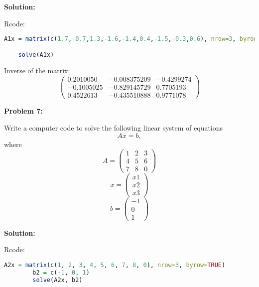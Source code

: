 \documentclass[12pt]{article}
\newenvironment{problem}[1]{
    \textbf{Problem #1:}
}{
    \rmfamily \vspace{1em}
}
\newenvironment{solution}{
    \textbf{Solution:}
    
}{
    
    \vspace{2em}
}
\begin{document}
\begin{solution}
    Rcode:
    \begin{lstlisting}[language=R]
    A1x = matrix(c(1.7,-0.7,1.3,-1.6,-1.4,0.4,-1.5,-0.3,0.6), nrow=3, byrow=TRUE)

    solve(A1x)
    \end{lstlisting}
    Inverse of the matrix:
    \[
    \begin{pmatrix}
        0.2010050 & -0.008375209 & -0.4299274 \\
        -0.1005025 & -0.829145729 & 0.7705193 \\
        0.4522613 & -0.435510888 & 0.9771078
    \end{pmatrix}
    \]
\end{solution}

\begin{problem}{7}
    Write a computer code to solve the following linear system of equations
    \[
        Ax = b,
    \]
    where
    \[
        A = \begin{pmatrix}
            1 & 2 & 3 \\
            4 & 5 & 6 \\
            7 & 8 & 0
        \end{pmatrix}
    \]
    \[
        x = \begin{pmatrix}
            x1 \\
            x2 \\
            x3
        \end{pmatrix}
    \]
    \[
        b = \begin{pmatrix}
            -1 \\
            0 \\
            1
        \end{pmatrix}
    \]
\end{problem}

\begin{solution}
    Rcode:
    \begin{lstlisting}[language=R]
        A2x = matrix(c(1, 2, 3, 4, 5, 6, 7, 8, 0), nrow=3, byrow=TRUE)
        b2 = c(-1, 0, 1)
        solve(A2x, b2)
    \end{lstlisting}
\end{solution}
\end{document}
